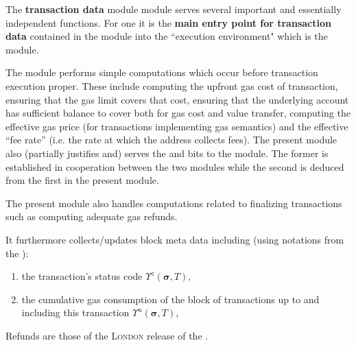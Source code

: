 The \textbf{transaction data} module \txnDataMod{} module serves several important and essentially independent functions.
For one it is the \textbf{main entry point for transaction data} contained in the \rlpTxnMod{} module into the ``execution environment" which is the \hubMod{} module.

The \txnDataMod{} module performs simple computations which occur before transaction execution proper.
These include computing the upfront gas cost of transaction,
ensuring that the gas limit covers that cost,
ensuring that the underlying account has sufficient balance to cover both for gas cost and value transfer,
computing the effective gas price (for transactions implementing \cite{EIP-1559} gas semantics)
and the effective ``fee rate'' (i.e. the rate at which the  address collects fees).
The present module also (partially justifies and) serves the \txRequiresEvmExecution{} and \txCopyTxcd{} bits to the \hubMod{} module. 
The former is established in cooperation between the two modules while the second is deduced from the first in the present module.


The present module also handles computations related to finalizing transactions
such as computing adequate gas refunds.

It furthermore collects/updates block meta data
including (using notations from the \cite{EYP-London}):
\begin{enumerate}
        \item the transaction's status code $\Upsilon^z(\bm{\sigma}, T)$,
        \item the cumulative gas consumption of the block of transactions up to and including this transaction $\Upsilon^u(\bm{\sigma}, T)$,
\end{enumerate}

\saNote{}
Refunds are those of the \textsc{London} release of the \evm{}.
